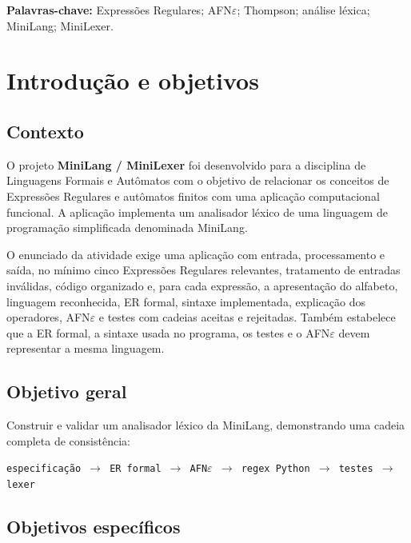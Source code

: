 \documentclass[12pt,a4paper,oneside]{report}
\begin{document}
\textbf{Palavras-chave:} Expressões Regulares; AFN$\varepsilon$; Thompson; análise léxica; MiniLang; MiniLexer.

\tableofcontents
\clearpage
{}


\chapter{Introdução e objetivos}

\section{Contexto}

O projeto \textbf{MiniLang / MiniLexer} foi desenvolvido para a disciplina de Linguagens Formais e Autômatos com o objetivo de relacionar os conceitos de Expressões Regulares e autômatos finitos com uma aplicação computacional funcional. A aplicação implementa um analisador léxico de uma linguagem de programação simplificada denominada MiniLang.

O enunciado da atividade exige uma aplicação com entrada, processamento e saída, no mínimo cinco Expressões Regulares relevantes, tratamento de entradas inválidas, código organizado e, para cada expressão, a apresentação do alfabeto, linguagem reconhecida, ER formal, sintaxe implementada, explicação dos operadores, AFN$\varepsilon$ e testes com cadeias aceitas e rejeitadas. Também estabelece que a ER formal, a sintaxe usada no programa, os testes e o AFN$\varepsilon$ devem representar a mesma linguagem.

\section{Objetivo geral}

Construir e validar um analisador léxico da MiniLang, demonstrando uma cadeia completa de consistência:

\begin{center}
\texttt{especificação $\rightarrow$ ER formal $\rightarrow$ AFN$\varepsilon$ $\rightarrow$ regex Python $\rightarrow$ testes $\rightarrow$ lexer}
\end{center}

\section{Objetivos específicos}
\end{document}
